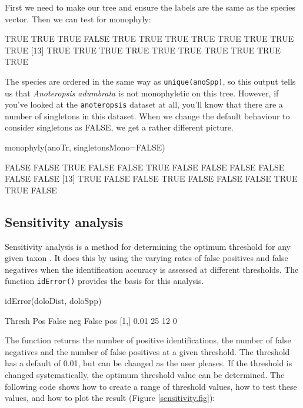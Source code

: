 \documentclass{article}
\newcommand{\scinm}{\emph}
\newcommand{\fun}[1]{\texttt{#1}}
\begin{document}
First we need to make our tree and ensure the labels are the same as the species vector. Then we can test for monophyly:


\begin{Routput}
 [1]  TRUE  TRUE  TRUE FALSE  TRUE  TRUE  TRUE  TRUE  TRUE  TRUE  TRUE  TRUE
[13]  TRUE  TRUE  TRUE  TRUE  TRUE  TRUE  TRUE  TRUE  TRUE  TRUE
\end{Routput}

The species are ordered in the same way as \fun{unique(anoSpp)}, so this output tells us that \scinm{Anoteropsis adumbrata} is not monophyletic on this tree. However, if you've looked at the \fun{anoteropsis} dataset at all, you'll know that there are a number of singletons in this dataset. When we change the default behaviour to consider singletons as FALSE, we get a rather different picture.

\begin{console}
monophyly(anoTr, singletonsMono=FALSE)
\end{console}

\begin{Routput}
 [1] FALSE FALSE  TRUE FALSE FALSE  TRUE FALSE FALSE FALSE FALSE FALSE FALSE
[13]  TRUE FALSE FALSE  TRUE FALSE FALSE FALSE  TRUE  TRUE FALSE
\end{Routput}

\subsection{Sensitivity analysis}
Sensitivity analysis is a method for determining the optimum threshold for any given taxon \citep{Meye.Paul.2005}. It does this by using the varying rates of false positives and false negatives when the identification accuracy is assessed at different thresholds. The function \fun{idError()} provides the basis for this analysis. 

\begin{console}
idError(doloDist, doloSpp)
\end{console}

\begin{Routput}
     Thresh Pos False neg False pos
[1,]   0.01  25        12         0
\end{Routput}

The function returns the number of positive identifications, the number of false negatives and the number of false positives at a given threshold. The threshold has a default of 0.01, but can be changed as the user pleases. If the threshold is changed systematically, the optimum threshold value can be determined. The following code shows how to create a range of threshold values, how to test these values, and how to plot the result (Figure \ref{sensitivity.fig}):
\end{document}
